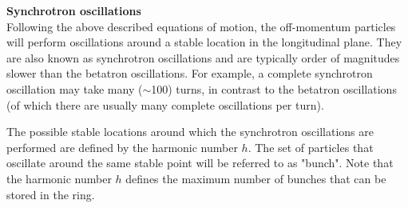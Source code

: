 
\textbf{Synchrotron oscillations}\\
Following the above described equations of motion, the off-momentum particles will perform oscillations around a stable location in the longitudinal plane.  They are also known as synchrotron oscillations and are typically order of magnitudes slower than the betatron oscillations. For example, a complete synchrotron oscillation may take many ($\sim$100) turns, in contrast to the betatron oscillations (of which there are usually many complete oscillations per turn).

The possible stable locations around which the synchrotron oscillations are performed are defined by the harmonic number $h$. The set of particles that oscillate around the same stable point will be referred to as "bunch". Note that the harmonic number $h$ defines the maximum number of bunches that can be stored in the ring.


